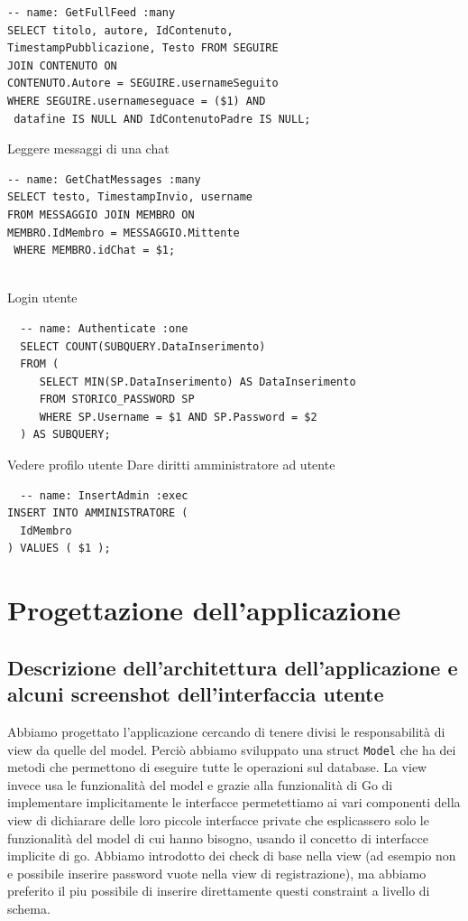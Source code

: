 \documentclass[a4paper,12pt]{report}
\begin{document}
\begin{lstlisting}
-- name: GetFullFeed :many
SELECT titolo, autore, IdContenuto, 
TimestampPubblicazione, Testo FROM SEGUIRE 
JOIN CONTENUTO ON 
CONTENUTO.Autore = SEGUIRE.usernameSeguito  
WHERE SEGUIRE.usernameseguace = ($1) AND
 datafine IS NULL AND IdContenutoPadre IS NULL;
\end{lstlisting}

Leggere messaggi di una chat
\begin{lstlisting}
-- name: GetChatMessages :many
SELECT testo, TimestampInvio, username 
FROM MESSAGGIO JOIN MEMBRO ON 
MEMBRO.IdMembro = MESSAGGIO.Mittente
 WHERE MEMBRO.idChat = $1;
 
\end{lstlisting}

Login utente
\begin{lstlisting}
  -- name: Authenticate :one
  SELECT COUNT(SUBQUERY.DataInserimento)
  FROM (
     SELECT MIN(SP.DataInserimento) AS DataInserimento
     FROM STORICO_PASSWORD SP 
     WHERE SP.Username = $1 AND SP.Password = $2
  ) AS SUBQUERY;
\end{lstlisting}

Vedere profilo utente
Dare diritti amministratore ad utente
\begin{lstlisting}
  -- name: InsertAdmin :exec
INSERT INTO AMMINISTRATORE (
  IdMembro
) VALUES ( $1 );
\end{lstlisting}

\chapter{Progettazione dell'applicazione}
\section{Descrizione dell'architettura dell'applicazione e alcuni screenshot dell'interfaccia utente}
Abbiamo progettato l'applicazione cercando di tenere divisi le responsabilità di view da quelle del model. 
Perciò abbiamo sviluppato una struct \texttt{Model} che ha dei metodi che permettono di eseguire tutte le operazioni sul database. 
La view invece usa le funzionalità del model e grazie alla funzionalità di Go di implementare implicitamente le interfacce permetettiamo ai vari componenti della view di dichiarare delle loro piccole interfacce private che esplicassero solo le funzionalità del model di cui hanno bisogno, usando il concetto di interfacce implicite di go.
Abbiamo introdotto dei check di base nella view (ad esempio non e possibile inserire password vuote nella view di registrazione), ma abbiamo preferito il piu possibile
di inserire direttamente questi constraint a livello di schema.
\newline
\end{document}
